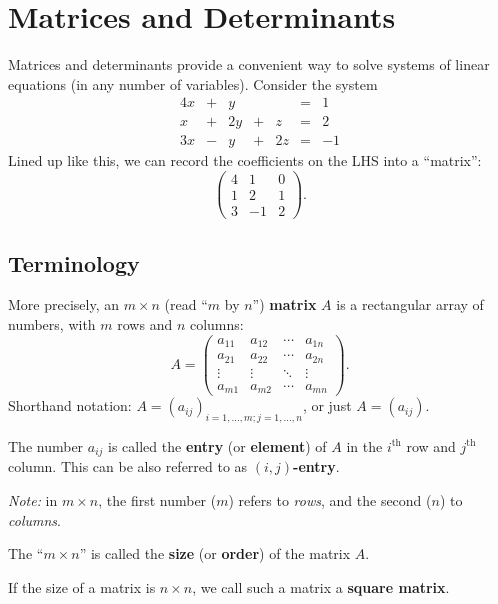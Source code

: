 \documentclass[
  12pt,
  oneside]{book}
\theoremstyle{definition}
\theoremstyle{definition}
\theoremstyle{definition}
\theoremstyle{definition}
\theoremstyle{remark}
\begin{document}
\hypertarget{matrices-and-determinants}{%
\chapter{Matrices and Determinants}\label{matrices-and-determinants}}

Matrices and determinants provide a convenient way to solve systems of linear
equations (in any number of variables). Consider the system
\[
\begin{matrix}
    4x & + & y  &   &    & = & 1\\
    x  & + & 2y & + & z  & = & 2\\
    3x & - & y  & + & 2z & = & -1
\end{matrix}
\]
Lined up like this, we can record the coefficients on the LHS into a ``matrix'':
\[
\begin{pmatrix}
    4 & 1 & 0\\ 1 & 2 & 1 \\ 3 & -1 & 2
\end{pmatrix}.
\]

\hypertarget{terminology}{%
\section{Terminology}\label{terminology}}

More precisely, an \(m\times n\) (read ``\(m\) by \(n\)'') \textbf{matrix} \(A\) is a rectangular array of numbers, with \(m\) rows and \(n\) columns:
\[
A = \begin{pmatrix}
    a_{11} & a_{12} & \cdots & a_{1n}\\
    a_{21} & a_{22} & \cdots & a_{2n}\\
    \vdots & \vdots & \ddots & \vdots \\
    a_{m1} & a_{m2} & \cdots & a_{mn}
\end{pmatrix}.
\]
Shorthand notation: \(A=(a_{ij})_{i=1,\dots,m; j=1,\dots,n}\), or just \(A=(a_{ij})\).

The number \(a_{ij}\) is called the \textbf{entry} (or \textbf{element}) of \(A\) in the \(i^\text{th}\) row and \(j^\text{th}\) column. This can be also referred to as \textbf{\((i,j)\)-entry}.

\emph{Note:} in \(m\times n\), the first number (\(m\)) refers to \emph{rows}, and the second (\(n\)) to \emph{columns}.

The ``\(m \times n\)'' is called the \textbf{size} (or \textbf{order}) of the matrix \(A\).

If the size of a matrix is \(n\times n\), we call such a matrix a \textbf{square matrix}.
\end{document}
